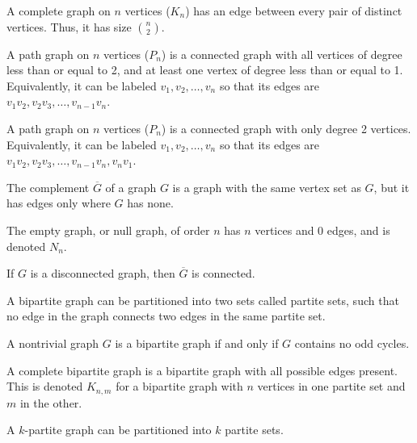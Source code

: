 \documentclass{article}
\begin{document}
\medskip
{}

    A complete graph on $n$ vertices ($K_n$) has an edge between every pair of distinct vertices.
    Thus, it has size ${n \choose 2}$.

\medskip
{}

    A path graph on $n$ vertices ($P_n$) is a connected graph with all vertices of degree less than or equal to 2, and at least one vertex of degree less than or equal to 1. Equivalently, it can be labeled $v_1, v_2, \hdots, v_n$ so that its edges are $v_1v_2, v_2v_3, \hdots, v_{n-1}v_n$.

\medskip
{}

    A path graph on $n$ vertices ($P_n$) is a connected graph with only degree 2 vertices. Equivalently, it can be labeled $v_1, v_2, \hdots, v_n$ so that its edges are $v_1v_2, v_2v_3, \hdots, v_{n-1}v_n, v_nv_1$.

\medskip
{}

    The complement $\overline G$ of a graph $G$ is a graph with the same vertex set as $G$, but it has edges only where $G$ has none.

\medskip
{}

    The empty graph, or null graph, of order $n$ has $n$ vertices and 0 edges, and is denoted $N_n$.

\medskip
{}

    If $G$ is a disconnected graph, then $\overline G$ is connected.

\medskip
{}

    A bipartite graph can be partitioned into two sets called partite sets, such that no edge in the graph connects two edges in the same partite set.

\medskip
{}

    A nontrivial graph $G$ is a bipartite graph if and only if $G$ contains no odd cycles.

\medskip
{}

    A complete bipartite graph is a bipartite graph with all possible edges present. This is denoted $K_{n,m}$ for a bipartite graph with $n$ vertices in one partite set and $m$ in the other.

\medskip
{}

    A $k$-partite graph can be partitioned into $k$ partite sets.
\end{document}
